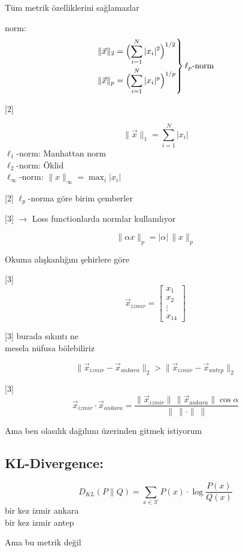 \documentclass[11pt,a4paper]{article}
\begin{document}
Tüm metrik özelliklerini sağlamazlar

norm:
\[
\left.
\begin{aligned}
\|\vec{x}\|_2 &= \Bigl(\sum_{i=1}^{N} |x_i|^2\Bigr)^{1/2} \\
\|\vec{x}\|_p &= \Bigl(\sum_{i=1}^{N} |x_i|^p\Bigr)^{1/p}
\end{aligned}
\right\} \ell_p\text{-norm}
\]

[2]

\[ \|\vec{x}\|_1 = \sum_{i=1}^{N} |x_i| \]
$\ell_1$-norm: Manhattan norm \\
$\ell_2$-norm: Öklid \\
$\ell_\infty$-norm: $\|x\|_\infty = \max_i |x_i|$

[2]
$\ell_p$-norma göre birim çemberler

[3]
$\rightarrow$ Loss functionlarda normlar kullanılıyor

\[ \|\alpha x\|_p = |\alpha|\,\|x\|_p \]

Okuma alışkanlığını şehirlere göre

[3]
\[ \vec{x}_{izmir} = \begin{bmatrix} x_1 \\ x_2 \\ \vdots \\ x_{14} \end{bmatrix} \]

[3]
burada sıkıntı ne \\
mesela nüfusa bölebiliriz

\[ \|\vec{x}_{izmir}-\vec{x}_{ankara}\|_2 > \|\vec{x}_{izmir}-\vec{x}_{antep}\|_2 \]

[3]
\[ \vec{x}_{izmir}\cdot\vec{x}_{ankara} = \frac{\|\vec{x}_{izmir}\|\,\|\vec{x}_{ankara}\|\cos\alpha}{\|\ \|\cdot\|\ \|} \]

Ama ben olasılık dağılımı üzerinden gitmek istiyorum

\subsection{KL-Divergence:}
\[ D_{KL}(P\|Q) = \sum_{x\in\mathcal{X}} P(x)\cdot\log\frac{P(x)}{Q(x)} \]
bir kez izmir ankara \\
bir kez izmir antep

Ama bu metrik değil
\end{document}
